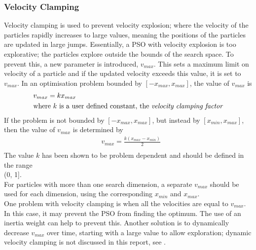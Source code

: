 \subsubsection{Velocity Clamping}
Velocity clamping is used to prevent velocity explosion; where the velocity of the particles rapidly increases to large values, meaning the positions of the particles are updated in large jumps. Essentially, a PSO with velocity explosion is too explorative; the particles explore outside the bounds of the search space. To prevent this, a new parameter is introduced, $v_{max}$. This sets a maximum limit on velocity of a particle and if the updated velocity exceeds this value, it is set to $v_{max}$\cite{4-pso, psot, psoi}. In an optimisation problem bounded by $[-x_{max}, x_{max}]$, the value of $v_{max}$ is\cite{psot}
\begin{equation}
  \begin{split}
    &v_{max} = kx_{max} \\
    &\text{where } k\text{ is a user defined constant, the \emph{velocity clamping factor}} \\
  \end{split}
\end{equation}
If the problem is not bounded by $[-x_{max}, x_{max}]$, but instead by $[x_{min}, x_{max}]$, then the value of $v_{max}$ is determined by\cite{4-pso, psot}
\begin{equation}
  \begin{split}
    &v_{max} =\frac{k(x_{max} - x_{min})}{2} \\
  \end{split}
\label{eq:vmax}
\end{equation}
The value $k$ has been shown to be problem dependent and should be defined in the range \\(0, 1]\cite{4-pso, psot}.
\\For particles with more than one search dimension, a separate $v_{max}$ should be used for each dimension, using the corresponding $x_{min}$ and $x_{max}$.
\\One problem with velocity clamping is when all the velocities are equal to $v_{max}$. In this case, it may prevent the PSO from finding the optimum. The use of an inertia weight can help to prevent this. Another solution is to dynamically decrease $v_{max}$ over time, starting with a large value to allow exploration; dynamic velocity clamping is not discussed in this report, see \cite{4-pso}.

